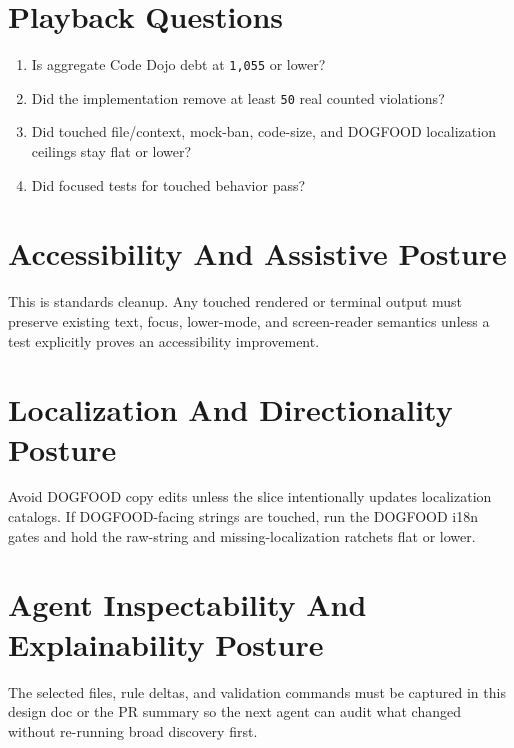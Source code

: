 \section{Playback Questions}\label{record-234-playback-questions}

\begin{enumerate}
\def\labelenumi{\arabic{enumi}.}
\tightlist
\item
  Is aggregate Code Dojo debt at \texttt{1\allowbreak{},\allowbreak{}0\allowbreak{}5\allowbreak{}5} or lower?
\item
  Did the implementation remove at least \texttt{5\allowbreak{}0} real counted violations?
\item
  Did touched file/context, mock-ban, code-size, and DOGFOOD localization ceilings stay flat or lower?
\item
  Did focused tests for touched behavior pass?
\end{enumerate}

\section{Accessibility And Assistive Posture}\label{record-234-accessibility-and-assistive-posture}

This is standards cleanup. Any touched rendered or terminal output must preserve existing text, focus, lower-mode, and screen-reader semantics unless a test explicitly proves an accessibility improvement.

\section{Localization And Directionality Posture}\label{record-234-localization-and-directionality-posture}

Avoid DOGFOOD copy edits unless the slice intentionally updates localization catalogs. If DOGFOOD-facing strings are touched, run the DOGFOOD i18n gates and hold the raw-string and missing-localization ratchets flat or lower.

\section{Agent Inspectability And Explainability Posture}\label{record-234-agent-inspectability-and-explainability-posture}

The selected files, rule deltas, and validation commands must be captured in this design doc or the PR summary so the next agent can audit what changed without re-running broad discovery first.

